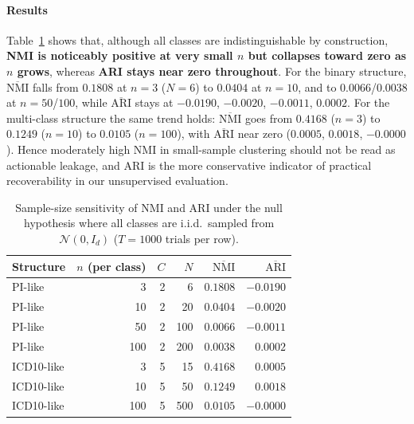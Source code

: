 \paragraph{Results} Table~\ref{tab:nmi-sample-size-sensitivity} shows that, although all classes are indistinguishable by construction, \textbf{NMI is noticeably positive at very small $n$ but collapses toward zero as $n$ grows}, whereas \textbf{ARI stays near zero throughout}. 
For the binary structure, $\overline{\mathrm{NMI}}$ falls from $0.1808$ at $n{=}3$ ($N{=}6$) to $0.0404$ at $n{=}10$, and to $0.0066$/$0.0038$ at $n{=}50$/$100$, while $\overline{\mathrm{ARI}}$ stays at $-0.0190$, $-0.0020$, $-0.0011$, $0.0002$. 
For the multi-class structure the same trend holds: $\overline{\mathrm{NMI}}$ goes from $0.4168$ ($n{=}3$) to $0.1249$ ($n{=}10$) to $0.0105$ ($n{=}100$), with $\overline{\mathrm{ARI}}$ near zero ($0.0005$, $0.0018$, $-0.0000$). 
Hence moderately high NMI in small-sample clustering should not be read as actionable leakage, and ARI is the more conservative indicator of practical recoverability in our unsupervised evaluation.

\begin{table}[ht]
  \centering
  \caption{Sample-size sensitivity of NMI and ARI under the null hypothesis where all
    classes are i.i.d.\ sampled from $\mathcal{N}(0,I_d)$ ($T{=}1000$ trials per row).}
  \label{tab:nmi-sample-size-sensitivity}
  \begin{tabular}{lrrrrr}
    \toprule
    Structure & $n$ (per class) & $C$ & $N$ & $\overline{\mathrm{NMI}}$ & $\overline{\mathrm{ARI}}$ \\
    \midrule
    PI-like    & 3   & 2 & 6   & $0.1808$ & $-0.0190$ \\
    PI-like    & 10  & 2 & 20  & $0.0404$ & $-0.0020$ \\
    PI-like    & 50  & 2 & 100 & $0.0066$ & $-0.0011$ \\
    PI-like    & 100 & 2 & 200 & $0.0038$ & $0.0002$  \\
    \midrule
    ICD10-like & 3   & 5 & 15  & $0.4168$ & $0.0005$  \\
    ICD10-like & 10  & 5 & 50  & $0.1249$ & $0.0018$  \\
    ICD10-like & 100 & 5 & 500 & $0.0105$ & $-0.0000$ \\
    \bottomrule
  \end{tabular}
\end{table}
